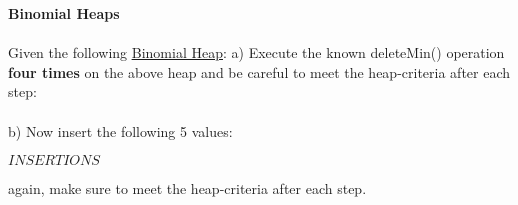 \textbf{\LARGE{\color{tumgadRed}Binomial Heaps}}\\
\\
\noindent
Given the following
\href{https://sebastianoner.github.io/TUMGAD/src/DataStructures/PriorityQueues/BinomialHeaps/BinomialHeaps}{\underline{Binomial Heap}}:
a) Execute the known deleteMin() operation \textbf{four times} on the above heap and be careful to meet the heap-criteria after each step:\\
\newline
\\
\newline
b) Now insert the following 5 values:
\begin{center}
    $INSERTIONS$
\end{center}
again, make sure to meet the heap-criteria after each step.\\
\newline
